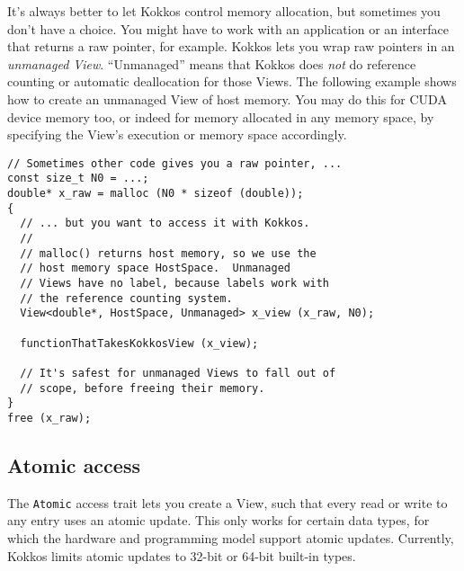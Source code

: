 It's always better to let Kokkos control memory allocation, but
sometimes you don't have a choice.  You might have to work with an
application or an interface that returns a raw pointer, for example.
Kokkos lets you wrap raw pointers in an \emph{unmanaged View}.
``Unmanaged'' means that Kokkos does \emph{not} do reference counting
or automatic deallocation for those Views.  The following example
shows how to create an unmanaged View of host memory.  You may do this
for CUDA device memory too, or indeed for memory allocated in any
memory space, by specifying the View's execution or memory space
accordingly.
\begin{lstlisting}
// Sometimes other code gives you a raw pointer, ...
const size_t N0 = ...;
double* x_raw = malloc (N0 * sizeof (double));
{
  // ... but you want to access it with Kokkos.
  //
  // malloc() returns host memory, so we use the 
  // host memory space HostSpace.  Unmanaged
  // Views have no label, because labels work with
  // the reference counting system.
  View<double*, HostSpace, Unmanaged> x_view (x_raw, N0);

  functionThatTakesKokkosView (x_view);

  // It's safest for unmanaged Views to fall out of
  // scope, before freeing their memory.
}
free (x_raw);
\end{lstlisting}

\subsection{Atomic access}

The \lstinline!Atomic! access trait lets you create a View, such that every
read or write to any entry uses an atomic update.  This only works for
certain data types, for which the hardware and programming model
support atomic updates.  Currently, Kokkos limits atomic updates to
32-bit or 64-bit built-in types.
